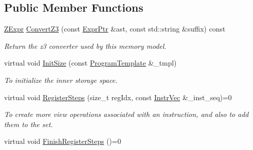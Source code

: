 \subsection*{Public Member Functions}
\begin{DoxyCompactItemize}
\item 
\mbox{\label{classilang_1_1_memory_model_ac6f80418fc68b761fc7895558a0cdad6}} 
\mbox{\hyperlink{classilang_1_1_memory_model_a9c7a763da08245af4a9465d261ed483a}{Z\+Expr}} \mbox{\hyperlink{classilang_1_1_memory_model_ac6f80418fc68b761fc7895558a0cdad6}{Convert\+Z3}} (const \mbox{\hyperlink{namespaceilang_a7c4196c72e53ea4df4b7861af7bc3bce}{Expr\+Ptr}} \&ast, const std\+::string \&suffix) const
\begin{DoxyCompactList}\small\item\em Return the z3 converter used by this memory model. \end{DoxyCompactList}\item 
\mbox{\label{classilang_1_1_memory_model_ace1b39ec7d6f17e946dcf915160b118f}} 
virtual void \mbox{\hyperlink{classilang_1_1_memory_model_ace1b39ec7d6f17e946dcf915160b118f}{Init\+Size}} (const \mbox{\hyperlink{classilang_1_1_memory_model_a72bd17543b5e5cbaefeb994c933622f5}{Program\+Template}} \&\+\_\+tmpl)
\begin{DoxyCompactList}\small\item\em To initialize the inner storage space. \end{DoxyCompactList}\item 
\mbox{\label{classilang_1_1_memory_model_acfdedf33eba608ee30582dc0eeb81d4e}} 
virtual void \mbox{\hyperlink{classilang_1_1_memory_model_acfdedf33eba608ee30582dc0eeb81d4e}{Register\+Steps}} (size\+\_\+t reg\+Idx, const \mbox{\hyperlink{classilang_1_1_memory_model_ac6cb2d9253fb53a10ea66fd1e71267bc}{Instr\+Vec}} \&\+\_\+inst\+\_\+seq)=0
\begin{DoxyCompactList}\small\item\em To create more view operations associated with an instruction, and also to add them to the set. \end{DoxyCompactList}\item 
\mbox{\label{classilang_1_1_memory_model_a485cec6011f853c04ed7822f53a36230}} 
virtual void \mbox{\hyperlink{classilang_1_1_memory_model_a485cec6011f853c04ed7822f53a36230}{Finish\+Register\+Steps}} ()=0

\end{DoxyCompactItemize}
